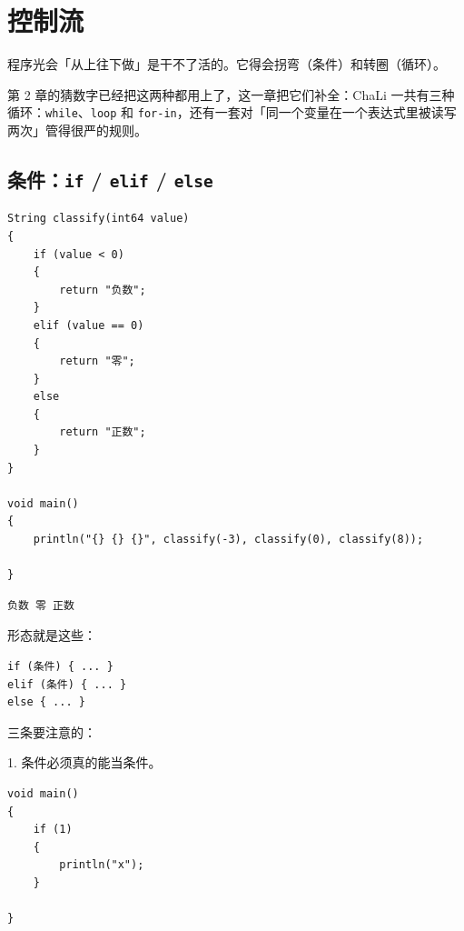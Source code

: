 \chapter{控制流}
\label{ch:05}

程序光会「从上往下做」是干不了活的。它得会拐弯（条件）和转圈（循环）。

第 2 章的猜数字已经把这两种都用上了，这一章把它们补全：ChaLi 一共有三种循环：\texttt{while}、\texttt{loop} 和 \texttt{for-in}，还有一套对「同一个变量在一个表达式里被读写两次」管得很严的规则。

\section{条件：\texttt{if} / \texttt{elif} / \texttt{else}}

\par
\medskip
\begin{lstlisting}[style=chali]
String classify(int64 value)
{
    if (value < 0)
    {
        return "负数";
    }
    elif (value == 0)
    {
        return "零";
    }
    else
    {
        return "正数";
    }
}

void main()
{
    println("{} {} {}", classify(-3), classify(0), classify(8));

}
\end{lstlisting}
\par
\medskip

\par
\medskip
\begin{lstlisting}[style=out]
负数 零 正数
\end{lstlisting}
\par
\medskip

形态就是这些：

\par
\medskip
\begin{lstlisting}[style=out]
if (条件) { ... }
elif (条件) { ... }
else { ... }
\end{lstlisting}
\par
\medskip

三条要注意的：

1. 条件必须真的能当条件。

\par
\medskip
\begin{lstlisting}[style=chali]
void main()
{
    if (1)
    {
        println("x");
    }

}
\end{lstlisting}
\par
\medskip

